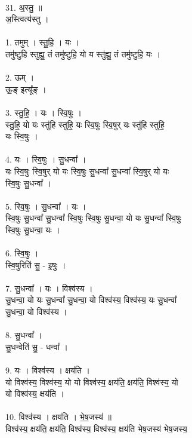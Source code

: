 \\
31. अ॒स्तु॒ ॥\\
अ॒स्त्वित्य॑स्तु ।\\
\\
1. तमुम् । स्तु॒हि॒ । यः ।\\
तमु॑ष्टुहि स्तुह्यु॒ तं तमु॑ष्टुहि॒ यो य स्तु॑ह्यु॒ तं तमु॑ष्टुहि॒ यः ।\\
\\
2. ऊम् ।\\
ऊ॒ङ् इत्यू᳚ङ् ।\\
\\
3. स्तु॒हि॒ । यः । स्वि॒षुः ।\\
स्तु॒हि॒ यो यः स्तु॑हि स्तुहि॒ यः स्वि॒षुः स्वि॒षुर् यः स्तु॑हि स्तुहि॒\\
यः स्वि॒षुः ।\\
\\
4. यः । स्वि॒षुः । सु॒धन्वा᳚ ।\\
यः स्वि॒षुः स्वि॒षुर् यो यः स्वि॒षुः सु॒धन्वा᳚ सु॒धन्वा᳚ स्वि॒षुर् यो यः\\
स्वि॒षुः सु॒धन्वा᳚ ।\\
\\
5. स्वि॒षुः । सु॒धन्वा᳚ । यः ।\\
स्वि॒षुः सु॒धन्वा᳚ सु॒धन्वा᳚ स्वि॒षुः स्वि॒षुः सु॒धन्वा॒ यो यः सु॒धन्वा᳚ स्वि॒षुः\\
स्वि॒षुः सु॒धन्वा॒ यः ।\\
\\
6. स्वि॒षुः ।\\
स्वि॒षुरिति॑ सु॒ - इ॒षुः ।\\
\\
7. सु॒धन्वा᳚ । यः । विश्व॑स्य ।\\
सु॒धन्वा॒ यो यः सु॒धन्वा᳚ सु॒धन्वा॒ यो विश्व॑स्य॒ विश्व॑स्य॒ यः सु॒धन्वा᳚\\
सु॒धन्वा॒ यो विश्व॑स्य ।\\
\\
8. सु॒धन्वा᳚ ।\\
सु॒धन्वेति॑ सु॒ - धन्वा᳚ ।\\
\\
9. यः । विश्व॑स्य । क्षय॑ति ।\\
यो विश्व॑स्य॒ विश्व॑स्य॒ यो यो विश्व॑स्य॒ क्षय॑ति॒ क्षय॑ति॒ विश्व॑स्य॒ यो\\
यो विश्व॑स्य॒ क्षय॑ति ।\\
\\
10. विश्व॑स्य । क्षय॑ति । भे॒ष॒जस्य॑ ॥\\
विश्व॑स्य॒ क्षय॑ति॒ क्षय॑ति॒ विश्व॑स्य॒ विश्व॑स्य॒ क्षय॑ति भेष॒जस्य॑ भेष॒जस्य॒\\
